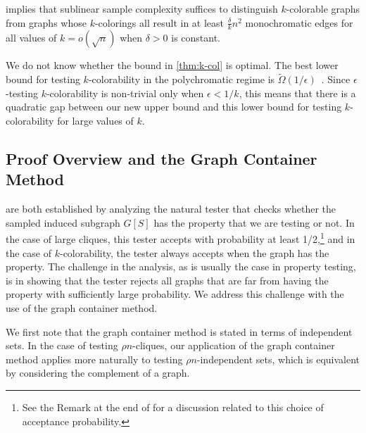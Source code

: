 \documentclass[11pt]{article}
\begin{document}
 implies that sublinear sample complexity suffices to distinguish $k$-colorable graphs from graphs whose $k$-colorings all result in at least $\frac{\delta}{k}n^2$ monochromatic edges for all values of $k = o(\sqrt{n})$ when $\delta > 0$ is constant.

We do not know whether the bound in \autoref{thm:k-col} is optimal. The best lower bound for testing $k$-colorability in the polychromatic regime is $\tilde{\Omega}(1/\epsilon)$~\cite{AlonKrivelevich02}. Since $\epsilon$-testing $k$-colorability is non-trivial only when $\epsilon < 1/k$, this means that there is a quadratic gap between our new upper bound and this lower bound for testing $k$-colorability for large values of $k$. 


\subsection{Proof Overview and the Graph Container Method}
\label{sect:overview}

 are both established by analyzing the natural tester that checks whether the sampled induced subgraph $G[S]$ has the property that we are testing or not. In the case of large cliques, this tester accepts with probability at least 1/2,\footnote{See the Remark at the end of  for a discussion related to this choice of acceptance probability.} and in the case of $k$-colorability, the tester always accepts when the graph has the property.
The challenge in the analysis, as is usually the case in property testing, is in showing that the tester rejects all graphs that are far from having the property with sufficiently large probability. We address this challenge with the use of the graph container method.

We first note that the graph container method is stated in terms of independent sets. In the case of testing $\rho n$-cliques, our application of the graph container method applies more naturally to testing $\rho n$-independent sets, which is equivalent by considering the complement of a graph.
\end{document}
